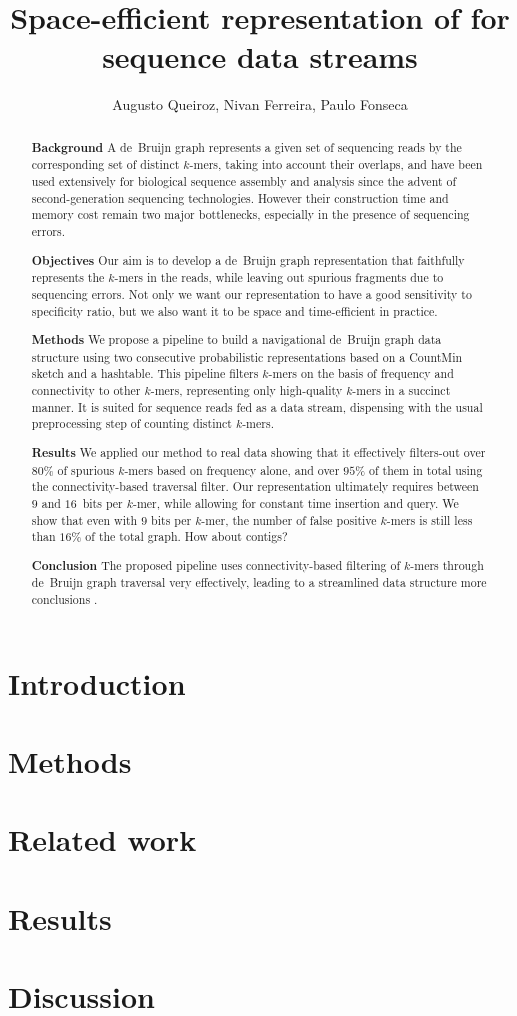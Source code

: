 \documentclass{article}
\title{Space-efficient representation of \dBG{s} for sequence data streams}
\author{Augusto Queiroz, Nivan Ferreira, Paulo Fonseca}
\newcommand{\dBG}{de~Bruijn graph\xspace}
\newcommand{\cm}{CountMin\xspace}
\newcommand{\kmer}{\mbox{$k$-mer}\xspace}
\newcommand{\kmers}{\mbox{$k$-mers}\xspace}
\newcommand{\todo}[2][]{\color{red} #2 \color{black}}
\begin{document}
	
\maketitle

\begin{abstract}
\noindent\textbf{Background} A \dBG represents a given set of sequencing reads by the corresponding set of distinct \kmers, taking into account their overlaps, and have been used extensively for biological sequence assembly and analysis since the advent of second-generation sequencing technologies. However their construction time and memory cost remain two major bottlenecks, especially in the presence of sequencing errors.

\noindent\textbf{Objectives} Our aim is to develop a \dBG representation that faithfully represents the \kmers in the reads, while leaving out spurious fragments due to sequencing errors. Not only we want our representation to have a good sensitivity to specificity ratio, but we also want it to be space and time-efficient in practice.

\noindent\textbf{Methods} We propose a pipeline to build a navigational \dBG data structure using two consecutive probabilistic representations based on a \cm sketch and a hashtable. This pipeline filters \kmer{s} on the basis of frequency and connectivity to other \kmer{s}, representing only high-quality \kmer{s} in a succinct manner. It is suited for sequence reads fed as a data stream, dispensing with the usual preprocessing step of counting distinct \kmers. 

\noindent\textbf{Results} We applied our method to \todo{real data} showing that it effectively filters-out \todo{over $80\%$} of spurious \kmer{s} based on frequency alone, and \todo{over $95\%$} of them in total using the connectivity-based traversal filter. Our representation ultimately requires between \todo{$9$ and $16$~bits} per \kmer, while allowing for constant time insertion and query. We show that even with \todo{$9$} bits per \kmer, the number of false positive \kmer{s} is still \todo{less than $16\%$} of the total graph. \todo{How about contigs?}

\noindent\textbf{Conclusion} The proposed pipeline uses connectivity-based filtering of \kmers through \dBG traversal very effectively, leading to a streamlined data structure \todo{more conclusions}.

\end{abstract}

	
\section{Introduction}

\section{Methods}

\section{Related work}

\section{Results}

\section{Discussion}
	
\end{document}
